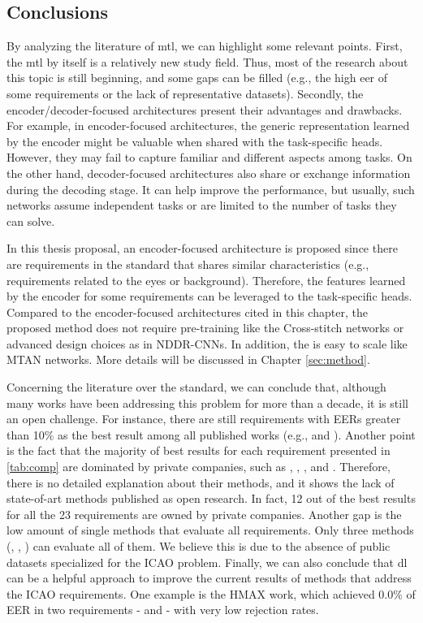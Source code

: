 \subsection{Conclusions}

By analyzing the literature of \acl{mtl}, we can highlight some relevant points. First, the \acs{mtl} by itself is a relatively new study field. Thus, most of the research about this topic is still beginning, and some gaps can be filled (e.g., the high \acs{eer} of some requirements or the lack of representative datasets). Secondly, the encoder/decoder-focused architectures present their advantages and drawbacks. For example, in encoder-focused architectures, the generic representation learned by the encoder might be valuable when shared with the task-specific heads. However, they may fail to capture familiar and different aspects among tasks. On the other hand, decoder-focused architectures also share or exchange information during the decoding stage. It can help improve the performance, but usually, such networks assume independent tasks or are limited to the number of tasks they can solve. 

In this thesis proposal, an encoder-focused architecture is proposed since there are requirements in the \icao standard that shares similar characteristics (e.g., requirements related to the eyes or background). Therefore, the features learned by the encoder for some requirements can be leveraged to the task-specific heads. Compared to the encoder-focused architectures cited in this chapter, the proposed method does not require pre-training like the Cross-stitch networks or advanced design choices as in NDDR-CNNs. In addition, the \methodname is easy to scale like MTAN networks. More details will be discussed in Chapter \ref{sec:method}.

Concerning the literature over the \icao standard, we can conclude that, although many works have been addressing this problem for more than a decade, it is still an open challenge. For instance, there are still requirements with EERs greater than 10\% as the best result among all published works (e.g., \lookingaway and \hairacrosseyes). Another point is the fact that the majority of best results for each requirement presented in \autoref{tab:comp} are dominated by private companies, such as \cite{biometrika}, \cite{id3}, \cite{seamfix}, and \cite{vsoft}. Therefore, there is no detailed explanation about their methods, and it shows the lack of state-of-art methods published as open research. In fact, 12 out of the best results for all the 23 requirements are owned by private companies. Another gap is the low amount of single methods that evaluate all requirements. Only three methods (\biolab, \biotest, \biopass) can evaluate all of them. We believe this is due to the absence of public datasets specialized for the ICAO problem. Finally, we can also conclude that \acl{dl} can be a helpful approach to improve the current results of methods that address the ICAO requirements. One example is the HMAX work, which achieved 0.0\% of EER in two requirements - \framestooheavy and \framecoveringeyes - with very low rejection rates.
